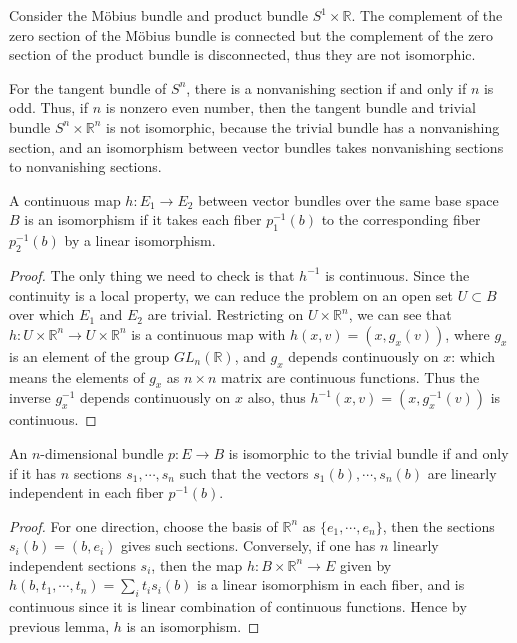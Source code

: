 \begin{exmp} Consider the M{\"o}bius bundle and product bundle $S^1\times \mathbb{R}$. The complement of the zero section of the M{\"o}bius bundle is connected but the complement of the zero section of the product bundle is disconnected, thus they are not isomorphic.
\end{exmp}

\begin{exmp} For the tangent bundle of $S^n$, there is a nonvanishing section if and only if $n$ is odd.  Thus, if $n$ is nonzero even number, then the tangent bundle and trivial bundle $S^n\times \mathbb{R}^n$ is not isomorphic, because the trivial bundle has a nonvanishing section, and an isomorphism between vector bundles takes nonvanishing sections to nonvanishing sections.
\end{exmp}

\begin{lemma} A continuous map $h:E_1\rightarrow E_2$ between vector bundles over the same base space $B$ is an isomorphism if it takes each fiber $p_1^{-1}(b)$ to the corresponding fiber $p_2^{-1}(b)$ by a linear isomorphism.
\end{lemma}
\begin{proof}
The only thing we need to check is that $h^{-1}$ is continuous. Since the continuity is a local property, we can reduce the problem on an open set $U\subset B$ over which $E_1$ and $E_2$ are trivial. Restricting on $U\times \mathbb{R}^n$, we can see that $h:U\times \mathbb{R}^n\rightarrow U\times \mathbb{R}^n$ is a continuous map with $h(x,v)=(x,g_x(v))$, where $g_x$ is an element of the group $GL_n(\mathbb{R})$, and $g_x$ depends continuously on $x$: which means the elements of $g_x$ as $n\times n$ matrix are continuous functions. Thus the inverse $g_x^{-1}$ depends continuously on $x$ also, thus $h^{-1}(x,v)=(x,g_x^{-1}(v))$ is continuous.
\end{proof}

\begin{prop} An $n$-dimensional bundle $p:E\rightarrow B$ is isomorphic to the trivial bundle if and only if it has $n$ sections $s_1,\cdots,s_n$ such that the vectors $s_1(b),\cdots,s_n(b)$ are linearly independent in each fiber $p^{-1}(b)$.
\end{prop}
\begin{proof}
For one direction, choose the basis of $\mathbb{R}^n$ as $\{e_1,\cdots,e_n\}$, then the sections $s_i(b)=(b,e_i)$ gives such sections. Conversely, if one has $n$ linearly independent sections $s_i$, then the map $h:B\times \mathbb{R}^n\rightarrow E$ given by $h(b,t_1,\cdots,t_n)=\sum_i t_i s_i(b)$ is a linear isomorphism in each fiber, and is continuous since it is linear combination of continuous functions. Hence by previous lemma, $h$ is an isomorphism.
\end{proof}

